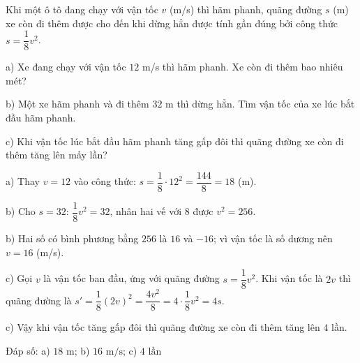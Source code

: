 \begin{problem}[9DS-HSB2-035]
Khi một ô tô đang chạy với vận tốc $v$ (m/s) thì hãm phanh, quãng đường $s$ (m) xe còn đi thêm được cho đến khi dừng hẳn được tính gần đúng bởi công thức $s = \dfrac{1}{8}v^2$.

a) Xe đang chạy với vận tốc $12$ m/s thì hãm phanh. Xe còn đi thêm bao nhiêu mét?

b) Một xe hãm phanh và đi thêm $32$ m thì dừng hẳn. Tìm vận tốc của xe lúc bắt đầu hãm phanh.

c) Khi vận tốc lúc bắt đầu hãm phanh tăng gấp đôi thì quãng đường xe còn đi thêm tăng lên mấy lần?

\begin{solution}
a) Thay $v = 12$ vào công thức: $s = \dfrac{1}{8} \cdot 12^2 = \dfrac{144}{8} = 18$ (m).

b) Cho $s = 32$: $\dfrac{1}{8}v^2 = 32$, nhân hai vế với $8$ được $v^2 = 256$.

b) Hai số có bình phương bằng $256$ là $16$ và $-16$; vì vận tốc là số dương nên $v = 16$ (m/s).

c) Gọi $v$ là vận tốc ban đầu, ứng với quãng đường $s = \dfrac{1}{8}v^2$. Khi vận tốc là $2v$ thì quãng đường là $s' = \dfrac{1}{8}(2v)^2 = \dfrac{4v^2}{8} = 4 \cdot \dfrac{1}{8}v^2 = 4s$.

c) Vậy khi vận tốc tăng gấp đôi thì quãng đường xe còn đi thêm tăng lên $4$ lần.

Đáp số: a) $\boxed{18 \text{ m}}$; b) $\boxed{16 \text{ m/s}}$; c) $\boxed{4 \text{ lần}}$
\end{solution}
\end{problem}

